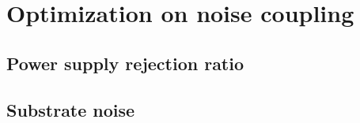 \chapter{Optimization on noise coupling}

\section{Power supply rejection ratio}

\section{Substrate noise}
















